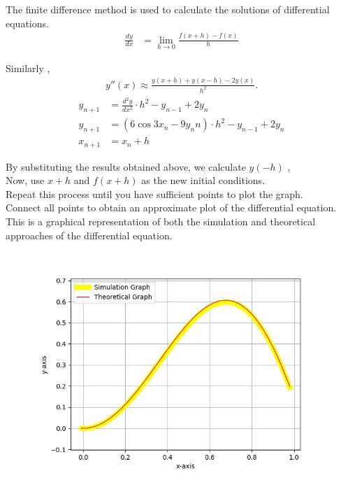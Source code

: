 \documentclass[journal]{IEEEtran}
\begin{document}
The finite difference method is used to calculate the solutions of differential equations.\\

\begin{align}
    \frac{dy}{dx} &= \lim_{h \to 0}\frac{f(x+h)-f(x)}{h}
\end{align}

Similarly ,
\begin{align}
    y''(x) \approx \frac{y(x+h) + y(x-h) - 2y(x)}{h^2}.
\end{align}
\begin{align}
     y_{n+1} &= \frac{d^2y}{dx^2} \cdot h^2 - y_{n-1} + 2y_{n}\\
     y_{n+1} &= (6 \cos 3x_{n} - 9y_{n}n) \cdot h^2 - y_{n-1} + 2y_{n}\\
    x_{n+1} &= x_{n} + h
\end{align}

By substituting the results obtained above, we calculate $y(-h)$ , \\

Now, use $x+h$ and $f(x+h)$ as the new initial conditions.\\ 

Repeat this process until you have sufficient points to plot the graph. \\

Connect all points to obtain an approximate plot of the differential equation. \\

This is a graphical representation of both the simulation and theoretical approaches of the differential equation.

\begin{figure}[h!]
   \centering
   \includegraphics[width=\columnwidth]{fig/combined_fig.jpg}
\end{figure}
\end{document}
